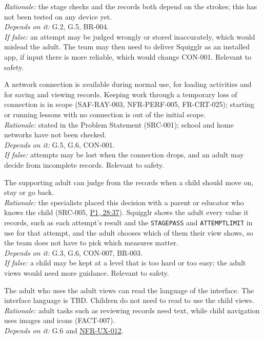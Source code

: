 \documentclass[12pt]{article}
\renewcommand{\_}{\textunderscore\allowbreak}%
\newcommand{\intlink}[3]{\hyperref[int:#1-#2]{#3}}
\newcommand{\intref}[2]{\intlink{#1}{#2}{#1, #2}}
\newcommand{\reqref}[1]{\hyperref[req:#1]{#1}}
\begin{document}
\begin{description}[style=nextline]
\emph{Rationale:} the stage checks and the records both depend on the strokes;
this has not been tested on any device yet.\\
\emph{Depends on it:} G.2, G.5, BR-004.\\
\emph{If false:} an attempt may be judged wrongly or stored inaccurately, which
would mislead the adult. The team may then need to deliver Squigglr as an
installed app, if input there is more reliable, which would change CON-001.
Relevant to safety.
\item[ASM-005] A network connection is available during normal use, for loading
activities and for saving and viewing records. Keeping work through a
temporary loss of connection is in scope (SAF-RAY-003, NFR-PERF-005,
FR-CRT-025); starting or running lessons with no connection is out of the
initial scope.\\
\emph{Rationale:} stated in the Problem Statement (SRC-001); school and home
networks have not been checked.\\
\emph{Depends on it:} G.5, G.6, CON-001.\\
\emph{If false:} attempts may be lost when the connection drops, and an adult
may decide from incomplete records. Relevant to safety.
\item[ASM-006] The supporting adult can judge from the records when a child
should move on, stay or go back.\\
\emph{Rationale:} the specialists placed this decision with a parent or educator
who knows the child (SRC-005, \intref{P1}{28:37}). Squigglr shows the adult
every value it records, such as each attempt's result and the
\texttt{STAGE\_PASS} and \texttt{ATTEMPT\_LIMIT} in use for that attempt, and
the adult chooses which of them their view shows, so the team does not have to
pick which measures matter.\\
\emph{Depends on it:} G.3, G.6, CON-007, BR-003.\\
\emph{If false:} a child may be kept at a level that is too hard or too easy;
the adult views would need more guidance. Relevant to safety.
\item[ASM-007] The adult who uses the adult views can read the language of the
interface. The interface language is TBD. Children do not need to read to use
the child views.\\
\emph{Rationale:} adult tasks such as reviewing records need text, while child
navigation uses images and icons (FACT-007).\\
\emph{Depends on it:} G.6 and \reqref{NFR-UX-012}.\\

\end{description}
\end{document}
